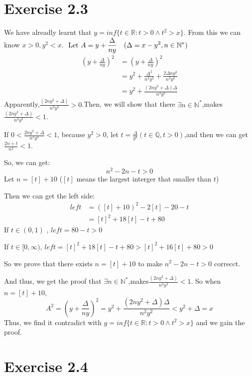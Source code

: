 \documentclass[11pt,twoside,a4paper]{article}
\begin{document}
\section{Exercise 2.3}
We have alreadly learnt that $y= inf\{t\in \mathbb{R}:t>0\land t^2>x\}$.  From this we can know $x>0, y^{2}<x$. 
$\displaystyle \text { Let } A=y+\frac{\Delta}{n y}\quad (\Delta=x-y^{2} ,n \in  \mathbb{N}^*)\\$
\begin{align*}
\left(y+\frac{\Delta}{n y}\right)^{2} &=\left(y+\frac{\Delta}{n y}\right)^{2} \\
&=y^{2}+\frac{\Delta^{2}}{n^{2} y^{2}}+\frac{2 \Delta n y^{2}}{n^{2} y^{2}} \\
&=y^{2}+\frac{\left(2 n y^{2}+\Delta\right) \Delta}{n^{2} y^{2}}
\end{align*}
Apparently,$\displaystyle\frac{(2 n y^{2}+\Delta) }{n^{2} y^{2}}>0$.Then, we will show that there $\exists n \in \mathbb{N}^*$,makes$\displaystyle\frac{(2 n y^{2}+\Delta) }{n^{2} y^{2}}<1$.\par\noindent
If $ \displaystyle 0<\frac{2 n y^{2}+\Delta}{n^{2} y^{2}}<1$,  because  $y^{2}>0 $,
let  $\displaystyle t=\frac{\Delta}{y^{2}}(t\in \mathbb{Q},t>0)$,and then we can  get
 $\displaystyle\frac{2 n+t}{n^{2}}<1 $.
\par\noindent
So, we can get:
$$n^{2}-2 n-t>0$$
Let $n=[t]+10$\,\,($[t]$ means the largest interger that smaller than $t$)
\par\noindent
Then we can get the left side:
\begin{align*}
left&=([t]+10)^2-2[t]-20-t  \\ &=[t]^2+18[t]-t+80
\end{align*}
If $t\in(0,1)$  ,  $left=80-t>0$
\par\noindent
If $t\in[0,\infty)$, $left=[t]^2+18[t]-t+80>[t]^2+16[t]+80>0$\par\noindent
So we prove that there exists $n=[t]+10$ to make $n^{2}-2 n-t>0$ correcct.\par\noindent
And thus, we get the proof that
$\exists n \in \mathbb{N}^*$,makes$\displaystyle\frac{(2 n y^{2}+\Delta) }{n^{2} y^{2}}<1$.  So when $n=[t]+10$, $$A^2=(y+\frac{\Delta}{n y})^{2}=y^{2}+\frac{(2 n y^{2}+\Delta) \Delta}{n^{2} y^{2}}<y^2+\Delta=x$$
Thus, we find it contradict with $y= inf\{t\in \mathbb{R}:t>0\land t^2>x\}$ and we gain the proof.





\section{Exercise 2.4}
\end{document}
